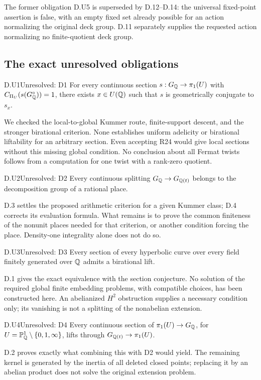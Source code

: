 

The former obligation D.U5 is superseded by D.12--D.14:
the universal fixed-point assertion is false, with an empty
fixed set already possible for an action normalizing the
original deck group. D.11 separately supplies the requested
action normalizing no finite-quotient deck group.

\subsection{The exact unresolved obligations}

\begin{claim}{D.U1}{Unresolved: D1}
For every continuous section $s:G_\mathbb Q\to\pi_1(U)$ with
$C_{\Pi_U}(s(G_\mathbb Q^\circ))=1$, there exists $x\in U(\mathbb Q)$
such that $s$ is geometrically conjugate to $s_x$.
\end{claim}
We checked the local-to-global Kummer route, finite-support descent,
and the stronger birational criterion. None establishes uniform
adelicity or birational liftability for an arbitrary section.
Even accepting R24 would give local sections without this missing
global condition. No conclusion about all Fermat twists follows
from a computation for one twist with a rank-zero quotient.

\begin{claim}{D.U2}{Unresolved: D2}
Every continuous splitting $G_\mathbb Q\to G_{\mathbb Q(t)}$ belongs to the
decomposition group of a rational place.
\end{claim}
D.3 settles the proposed arithmetic criterion for a given Kummer
class; D.4 corrects its evaluation formula. What remains is to
prove the common finiteness of the nonunit places needed for that
criterion, or another condition forcing the place. Density-one
integrality alone does not do so.

\begin{claim}{D.U3}{Unresolved: D3}
Every section of every hyperbolic curve over every field finitely
generated over $\mathbb Q$ admits a birational lift.
\end{claim}
D.1 gives the exact equivalence with the section conjecture. No
solution of the required global finite embedding problems, with
compatible choices, has been constructed here. An abelianized
$H^2$ obstruction supplies a necessary condition only; its
vanishing is not a splitting of the nonabelian extension.

\begin{claim}{D.U4}{Unresolved: D4}
Every continuous section of $\pi_1(U)\to G_\mathbb Q$, for
$U=\mathbb P^1_\mathbb Q\setminus\{0,1,\infty\}$, lifts through
$G_{\mathbb Q(t)}\to\pi_1(U)$.
\end{claim}
D.2 proves exactly what combining this with D2 would yield.
The remaining kernel is generated by the inertia of all deleted
closed points; replacing it by an abelian product does not solve
the original extension problem.

